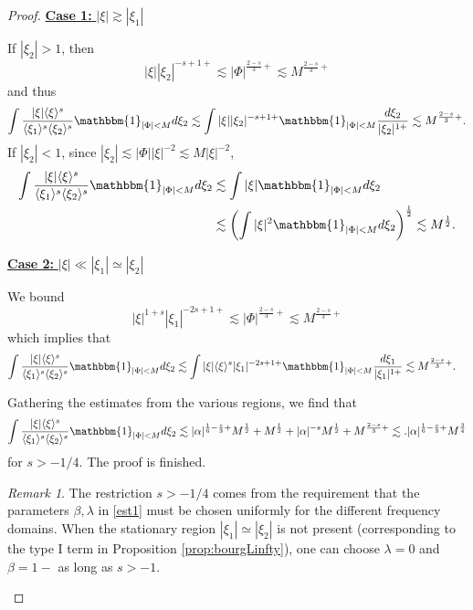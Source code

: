 \documentclass[%
11pt,  reqno]{amsart}
\newcommand{\jap}[1]{\langle #1 \rangle}
\newcommand{\5}{\textup{V}}
\newcommand{\noi}{\noindent}
\newcommand{\les}{\lesssim}
\theoremstyle{remark}
\newtheorem{remark}[theorem]{Remark}
\numberwithin{equation}{section}
\numberwithin{theorem}{section}
\begin{document}
\begin{proof}
\smallskip 
\noi
\underline{\textbf{Case 1:} $|\xi|\gtrsim |\xi_1|$} 

If $|\xi_2|>1$, then
$$
|\xi||\xi_2|^{-s+1+}\lesssim |\Phi|^{\frac{2-s}{3}+} \lesssim M^{\frac{2-s}{3}+}
$$
and thus
\begin{align}
\int \frac{|\xi|\jap{\xi}^s}{\jap{\xi_1}^s\jap{\xi_2}^s}\mathbbm{1}_{|\Phi|<M} d\xi_2 \les \int |\xi||\xi_2|^{-s+1+}\mathbbm{1}_{|\Phi|<M}\frac{d\xi_2}{|\xi_2|^{1+}}\lesssim M^{\frac{2-s}{3}+}.
\end{align}
If $|\xi_2|<1$, since $|\xi_2|\lesssim |\Phi||\xi|^{-2}\lesssim M|\xi|^{-2}$,
\begin{align}
\int \frac{|\xi|\jap{\xi}^s}{\jap{\xi_1}^s\jap{\xi_2}^s}\mathbbm{1}_{|\Phi|<M} d\xi_2 &\les \int |\xi|\mathbbm{1}_{|\Phi|<M}d\xi_2\\&\lesssim \left(\int |\xi|^2\mathbbm{1}_{|\Phi|<M} d\xi_2\right)^\frac12\lesssim M^{\frac12}.
\end{align}


\smallskip\noi
\underline{\textbf{Case 2:} $|\xi|\ll |\xi_1|\simeq |\xi_2|$} 

We bound
\begin{equation}\label{eq:estbm1}
    |\xi|^{1+s}|\xi_1|^{-2s+1+}\lesssim |\Phi|^{\frac{2-s}{3}+}\lesssim M^{\frac{2-s}{3}+}
\end{equation}
which implies that
\begin{align}
\int \frac{|\xi|\jap{\xi}^s}{\jap{\xi_1}^s\jap{\xi_2}^s}\mathbbm{1}_{|\Phi|<M} d\xi_2 &\les \int |\xi|\jap{\xi}^s|\xi_1|^{-2s+1+}\mathbbm{1}_{|\Phi|<M}\frac{d\xi_1}{|\xi_1|^{1+}}\lesssim  M^{\frac{2-s}{3}+}.
\end{align}

\medskip

Gathering the estimates from the various regions, we find that
\begin{align}
\int \frac{|\xi|\jap{\xi}^s}{\jap{\xi_1}^s\jap{\xi_2}^s}\mathbbm{1}_{|\Phi|<M} d\xi_2 \lesssim |\alpha|^{\frac16-\frac s3+}M^{\frac12} + M^{\frac12} + |\alpha|^{-s}M^{\frac12} +  M^{\frac{2-s}{3}+} \lesssim .|\alpha|^{\frac16-\frac s3+}M^{\frac34}
\end{align}
for $s>-1/4$. The proof is finished.

\begin{remark}
    The restriction $s>-1/4$ comes from the requirement that the parameters $\beta,\lambda$ in \eqref{est1} must be chosen uniformly for the different frequency domains. When the stationary region $|\xi_1|\simeq |\xi_2|$ is not present (corresponding to the type I term in Proposition \ref{prop:bourgLinfty}), one can choose $\lambda=0$ and $\beta=1-$ as long as $s>-1$.


\end{remark}
\end{proof}
\end{document}
